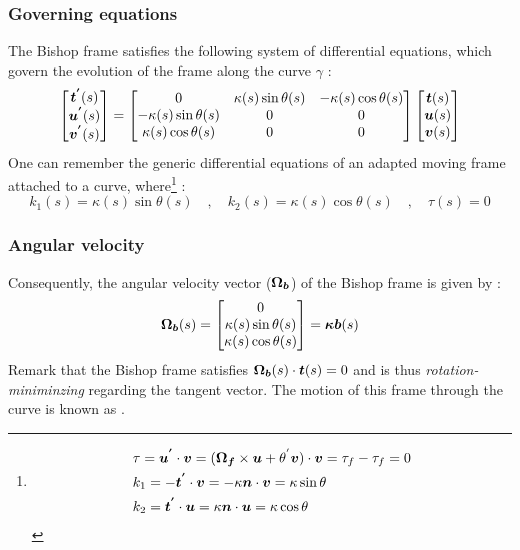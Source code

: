 \subsubsection{Governing equations}
The Bishop frame satisfies the following system of differential equations, which govern the evolution of the frame along the curve $\gamma$ :
\begin{equation}
	\begin{bmatrix}
		\boldsymbol{t^{'}}(s) \\
		\boldsymbol{u^{'}}(s) \\
		\boldsymbol{v^{'}}(s)
	\end{bmatrix}
	=
	\begin{bmatrix}
		0 & \kappa(s) \sin \theta(s) & -\kappa(s) \cos \theta(s) \\
		-\kappa(s) \sin \theta(s) & 0 & 0 \\
		\kappa(s) \cos \theta(s) & 0 & 0
	\end{bmatrix}
	\begin{bmatrix}
		\boldsymbol{t}(s) \\
		\boldsymbol{u}(s) \\
		\boldsymbol{v}(s)
	\end{bmatrix}
\label{eq:3_12}
\end{equation}
One can remember the generic differential equations of an adapted moving frame attached to a curve, where\footnote{
\begin{equation*}
	\begin{aligned}
		&\tau =\boldsymbol{u^{'}} \cdot \boldsymbol{v} = (\boldsymbol{\Omega_f} \times \boldsymbol{u} + \theta^{'} \boldsymbol{v})\cdot  \boldsymbol{v} = \tau_f - \tau_f = 0\\
		&k_1 = -\boldsymbol{t^{'}} \cdot \boldsymbol{v} = -\kappa \boldsymbol{n} \cdot \boldsymbol{v} = \kappa \sin \theta \\
		&k_2 = \boldsymbol{t^{'}} \cdot \boldsymbol{u} = \kappa \boldsymbol{n} \cdot \boldsymbol{u} = \kappa \cos \theta
	\end{aligned}
\end{equation*}
} :
\begin{equation}
k_{1}(s) = \kappa(s) \sin \theta(s)
\quad,\quad
k_{2}(s) = \kappa(s) \cos \theta(s)
\quad,\quad
\tau(s) = 0
\end{equation}

\subsubsection{Angular velocity}\label{sec:bishopvelocity}
Consequently, the angular velocity vector ($\boldsymbol{\Omega_{b}}$) of the Bishop frame is given by :
\begin{equation}
	\boldsymbol{\Omega_b}(s) 
	=
	\begin{bmatrix}
		0\\
		\kappa(s) \sin \theta(s)\\
		\kappa(s) \cos \theta(s)
	\end{bmatrix}
	= \boldsymbol{\kappa b}(s) 
\end{equation}
Remark that the Bishop frame satisfies $\boldsymbol{\Omega_b}(s) \cdot \boldsymbol{t}(s) = 0$ and is thus \emph{rotation-miniminzing} regarding the tangent vector. The motion of this frame through the curve is known as .

